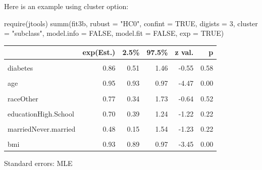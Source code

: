 \documentclass[
]{book}
\newenvironment{Shaded}{\begin{snugshade}}{\end{snugshade}}
\newcommand{\AttributeTok}[1]{\textcolor[rgb]{0.77,0.63,0.00}{#1}}
\newcommand{\ConstantTok}[1]{\textcolor[rgb]{0.00,0.00,0.00}{#1}}
\newcommand{\DecValTok}[1]{\textcolor[rgb]{0.00,0.00,0.81}{#1}}
\newcommand{\FunctionTok}[1]{\textcolor[rgb]{0.00,0.00,0.00}{#1}}
\newcommand{\NormalTok}[1]{#1}
\newcommand{\StringTok}[1]{\textcolor[rgb]{0.31,0.60,0.02}{#1}}
\begin{document}
Here is an example using cluster option:

\begin{Shaded}
\begin{Highlighting}[]
\FunctionTok{require}\NormalTok{(jtools)}
\FunctionTok{summ}\NormalTok{(fit3b, }\AttributeTok{rubust =} \StringTok{"HC0"}\NormalTok{, }\AttributeTok{confint =} \ConstantTok{TRUE}\NormalTok{, }\AttributeTok{digists =} \DecValTok{3}\NormalTok{, }
     \AttributeTok{cluster =} \StringTok{"subclass"}\NormalTok{, }\AttributeTok{model.info =} \ConstantTok{FALSE}\NormalTok{, }
     \AttributeTok{model.fit =} \ConstantTok{FALSE}\NormalTok{, }\AttributeTok{exp =} \ConstantTok{TRUE}\NormalTok{)}
\end{Highlighting}
\end{Shaded}

\begin{table}[!h]
\centering
\begin{threeparttable}
\begin{tabular}{lrrrrr}
\toprule
  & exp(Est.) & 2.5\% & 97.5\% & z val. & p\\
\midrule
\cellcolor{gray!6}{(Intercept)} & \cellcolor{gray!6}{100.02} & \cellcolor{gray!6}{8.74} & \cellcolor{gray!6}{1144.55} & \cellcolor{gray!6}{3.70} & \cellcolor{gray!6}{0.00}\\
diabetes & 0.86 & 0.51 & 1.46 & -0.55 & 0.58\\
\cellcolor{gray!6}{genderMale} & \cellcolor{gray!6}{0.38} & \cellcolor{gray!6}{0.21} & \cellcolor{gray!6}{0.69} & \cellcolor{gray!6}{-3.22} & \cellcolor{gray!6}{0.00}\\
age & 0.95 & 0.93 & 0.97 & -4.47 & 0.00\\
\cellcolor{gray!6}{raceHispanic} & \cellcolor{gray!6}{0.72} & \cellcolor{gray!6}{0.31} & \cellcolor{gray!6}{1.65} & \cellcolor{gray!6}{-0.78} & \cellcolor{gray!6}{0.43}\\
\addlinespace
raceOther & 0.77 & 0.34 & 1.73 & -0.64 & 0.52\\
\cellcolor{gray!6}{raceWhite} & \cellcolor{gray!6}{0.51} & \cellcolor{gray!6}{0.25} & \cellcolor{gray!6}{1.04} & \cellcolor{gray!6}{-1.85} & \cellcolor{gray!6}{0.06}\\
educationHigh.School & 0.70 & 0.39 & 1.24 & -1.22 & 0.22\\
\cellcolor{gray!6}{educationSchool} & \cellcolor{gray!6}{0.93} & \cellcolor{gray!6}{0.35} & \cellcolor{gray!6}{2.43} & \cellcolor{gray!6}{-0.15} & \cellcolor{gray!6}{0.88}\\
marriedNever.married & 0.48 & 0.15 & 1.54 & -1.23 & 0.22\\
\addlinespace
\cellcolor{gray!6}{marriedPreviously.married} & \cellcolor{gray!6}{0.84} & \cellcolor{gray!6}{0.45} & \cellcolor{gray!6}{1.57} & \cellcolor{gray!6}{-0.54} & \cellcolor{gray!6}{0.59}\\
bmi & 0.93 & 0.89 & 0.97 & -3.45 & 0.00\\
\bottomrule
\end{tabular}
\begin{tablenotes}
\item Standard errors: MLE
\end{tablenotes}
\end{threeparttable}
\end{table}
\end{document}
